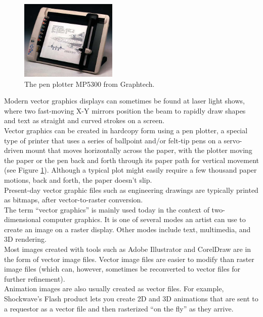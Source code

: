 \documentclass[]{usiinfbachelorproject}
\begin{document}
\begin{figure}
	\centering
	\includegraphics[width=0.41\textwidth]{img/plotter.jpeg}
	\caption{The pen plotter MP5300 from Graphtech.}
	\label{fig:plotter}
\end{figure} 
\noindent Modern vector graphics displays can sometimes be found at laser light shows, where two fast-moving X-Y mirrors position the beam to rapidly draw shapes and text as straight and curved strokes on a screen.\\
Vector graphics can be created in hardcopy form using a pen plotter, a special type of printer that uses a series of ballpoint and/or felt-tip pens on a servo-driven mount that moves horizontally across the paper, with the plotter moving the paper or the pen back and forth through its paper path for vertical movement (see Figure \ref{fig:plotter}). Although a typical plot might easily require a few thousand paper motions, back and forth, the paper doesn't slip.\\
Present-day vector graphic files such as engineering drawings are typically printed as bitmaps, after vector-to-raster conversion.\\
The term ``vector graphics'' is mainly used today in the context of two-dimensional computer graphics. It is one of several modes an artist can use to create an image on a raster display. Other modes include text, multimedia, and 3D rendering.\\
Most images created with tools such as Adobe Illustrator and CorelDraw are in the form of vector image files. Vector image files are easier to modify than raster image files (which can, however, sometimes be reconverted to vector files for further refinement).\\
Animation images are also usually created as vector files. For example, Shockwave's Flash product lets you create 2D and 3D animations that are sent to a requestor as a vector file and then rasterized ``on the fly'' as they arrive.
\end{document}
